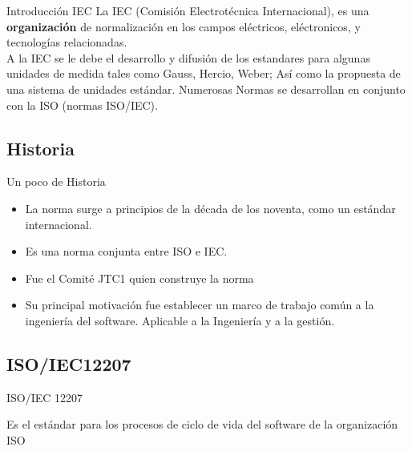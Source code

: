 \documentclass{beamer}
\begin{document}
			\begin{frame}{Introducción IEC}
				La IEC (Comisión Electrotécnica Internacional), es una \textbf{organización} de normalización en los campos eléctricos, eléctronicos, y tecnologías relacionadas.\\ \smallskip
				A la IEC se le debe el desarrollo y difusión de los estandares para algunas unidades de medida tales como Gauss, Hercio, Weber; Así como la propuesta de una sistema de unidades estándar. Numerosas Normas se desarrollan en conjunto con la ISO (normas ISO/IEC).
			\end{frame}
			
			\subsection{Historia}
				\begin{frame}{Un poco de Historia}
					\begin{itemize}
						\item La norma surge a principios de la década de los noventa, como un estándar internacional.\pause
						\item Es una norma conjunta entre ISO e IEC.\pause
						\item Fue el Comité JTC1 quien construye la norma\pause
						\item Su principal motivación fue establecer un marco de trabajo común a la ingeniería del software. Aplicable a la Ingeniería y a la gestión.
					\end{itemize}
				\end{frame}
				\subsection{ISO/IEC12207}
				\begin{frame}{ISO/IEC 12207}
					\begin{definition}
						Es el estándar para los procesos de ciclo de vida del software de la organización ISO
					\end{definition}
				\end{frame}
				
\end{document}
